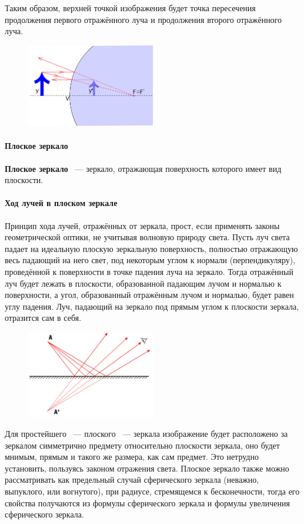 \documentclass[11pt]{article}
\begin{document}
\begin{enumerate}
			Таким образом, верхней точкой изображения будет точка пересечения продолжения первого отражённого луча и продолжения второго отражённого луча.
			\begin{figure}[!ht]
				\centering
				\includegraphics[width=0.5\textwidth]{assets/mirrors/sphere_mirror5.png}
			\end{figure}
			\paragraph{Плоское зеркало}
			\textbf{Плоское зеркало} ~--- зеркало, отражающая поверхность которого имеет вид плоскости.
			\paragraph{Ход лучей в плоском зеркале}
			Принцип хода лучей, отражённых от зеркала, прост, если применять законы геометрической оптики, не учитывая волновую природу света. Пусть луч света падает на идеальную плоскую зеркальную поверхность, полностью отражающую весь падающий на него свет, под некоторым углом к нормали (перпендикуляру), проведённой к поверхности в точке падения луча на зеркало. Тогда отражённый луч будет лежать в плоскости, образованной падающим лучом и нормалью к поверхности, а угол, образованный отражённым лучом и нормалью, будет равен углу падения. Луч, падающий на зеркало под прямым углом к плоскости зеркала, отразится сам в себя.
			\begin{figure}[!ht]
				\centering
				\includegraphics[width=0.5\textwidth]{assets/mirrors/plane_mirror.png}
			\end{figure}
			Для простейшего ~--- плоского ~--- зеркала изображение будет расположено за зеркалом симметрично предмету относительно плоскости зеркала, оно будет мнимым, прямым и такого же размера, как сам предмет. Это нетрудно установить, пользуясь законом отражения света. Плоское зеркало также можно рассматривать как предельный случай сферического зеркала (неважно, выпуклого, или вогнутого), при радиусе, стремящемся к бесконечности, тогда его свойства получаются из формулы сферического зеркала и формулы увеличения сферического зеркала.

\end{enumerate}
\end{document}
